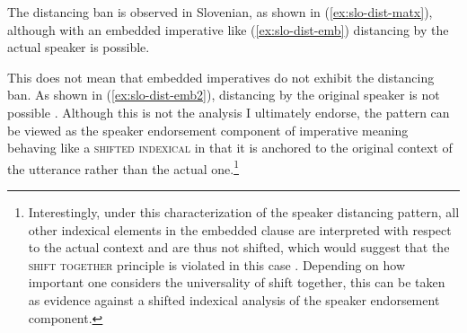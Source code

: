 \documentclass[output=paper,colorlinks,citecolor=brown]{langscibook}
\begin{document}
\ea \label{ex:dist} 
\z\z 

\noindent The distancing ban is observed in Slovenian, as shown in (\ref{ex:slo-dist-matx}), although with an embedded imperative like (\ref{ex:slo-dist-emb}) distancing by the actual speaker is possible.

\ea {}
\z\z         

\noindent This does not mean that embedded imperatives do not exhibit the distancing ban. As shown in (\ref{ex:slo-dist-emb2}), distancing by the original speaker is not possible   \citep{stegoveckaufmann}. Although this is not the analysis I ultimately endorse, the pattern can be viewed as the speaker endorsement component of imperative meaning behaving like a \textsc{shifted indexical} \citep{schlenkerPLEA} in that it is anchored to the original context of the utterance rather than the actual one.\footnote{Interestingly, under this characterization of the speaker distancing pattern, all other indexical elements in the embedded clause are interpreted with respect to the actual context and are thus not shifted, which would suggest that the \textsc{shift together} principle \citep{anand-nevins04} is violated in this case \citep[see][]{stegoveckaufmann}. Depending on how important one considers the universality of shift together, this can be taken as evidence against a shifted indexical analysis of the speaker endorsement component.}      
\z 
\end{document}
